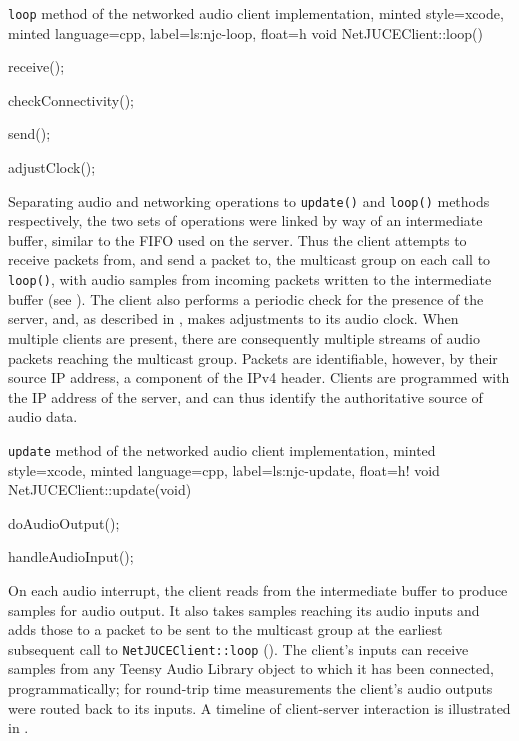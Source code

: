\begin{codelisting}{
    \texttt{loop} method of the networked audio client implementation,
    minted style=xcode,
    minted language=cpp,
    label=ls:njc-loop,
    float=h
}
    void NetJUCEClient::loop() {
        receive();

        checkConnectivity();

        send();

        adjustClock();
    }
\end{codelisting}

Separating audio and networking operations to \texttt{update()} and
\texttt{loop()} methods respectively, the two sets of operations were linked
by way of an intermediate buffer, similar to the FIFO used on the server.
Thus the client attempts to receive packets from, and send a packet to, the
multicast group on each call to \texttt{loop()}, with audio samples from
incoming packets written to the intermediate buffer (see ).
The client also performs a periodic check for the presence of the server, and,
as described in , makes adjustments to its audio
clock.
When multiple clients are present, there are consequently multiple streams of
audio packets reaching the multicast group.
Packets are identifiable, however, by their source IP address, a component of
the IPv4 header.
Clients are programmed with the IP address of the server, and can thus identify
the authoritative source of audio data.

\begin{codelisting}{
    \texttt{update} method of the networked audio client implementation,
    minted style=xcode,
    minted language=cpp,
    label=ls:njc-update,
    float=h!
}
    void NetJUCEClient::update(void) {
        doAudioOutput();

        handleAudioInput();
    }
\end{codelisting}

On each audio interrupt, the client reads from the intermediate buffer to
produce samples for audio output.
It also takes samples reaching its audio inputs and adds those to a packet to be
sent to the multicast group at the earliest subsequent call to
\texttt{NetJUCEClient::loop} ().
The client's inputs can receive samples from any Teensy Audio Library object to
which it has been connected, programmatically;
for round-trip time measurements the client's audio outputs were routed back to
its inputs.
A timeline of client-server interaction is illustrated in .

